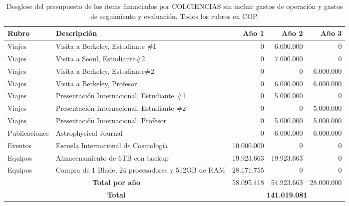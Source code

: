\begin{table}[h]
\begin{center}
\begin{tabular}{|l|p{5.5cm}|r|r|r|}\hline
{\bf Rubro}	&{\bf Descripción}	& {\bf Año 1}	& {\bf Año 2}	& {\bf Año 3}\\\hline
Viajes	&Visita a Berkeley, Estudiante \#1	&0	&	6.000.000&0\\\hline
Viajes	&Visita a Seoul,  Estudiante\#2	&0	&7.000.000	&0\\\hline
Viajes	&Visita a Berkeley,  Estudiante\#2	&0	&0& 6.000.000 \\\hline
Viajes	&Visita a Berkeley, Profesor	&0	&6.000.000	&6.000.000\\\hline
Viajes	&Presentación Internacional, Estudiante \#1	&0	&5.000.000	&0\\\hline
Viajes	&Presentación Internacional, Estudiante \#2	&0	&0	&5.000.000\\\hline
Viajes	&Presentación Internacional, Profesor	&0	&5.000.000	&5.000.000\\\hline
Publicaciones	&Astrophysical Journal	&0	&6.000.000	&6.000.000\\\hline
Eventos	&Escuela Internacional de Cosmología	&10.000.000	&0	&0\\\hline
Equipos	&Almacenamiento de 6TB con backup 	&19.923.663	&19.923.663	&0\\\hline
Equipos	&Compra de 1 Blade, 24 procesadores y 512GB de RAM 	&28.171.755	&0	&0\\\hline
\multicolumn{2}{|c|}{{\bf Total por año}}	 & 58.095.418	&54.923.663	&28.000.000 \\\hline
\multicolumn{2}{|c|}{\bf Total } & \multicolumn{3}{|c|}{{\bf 141.019.081}}\\\hline
\end{tabular} 
\caption{Desglose del presupuesto de los items financiados por COLCIENCIAS sin incluir gastos de 
operaci\'on y gastos de seguimiento y evaluaci\'on. Todos los rubros en COP.}
\end{center}
\label{Resumen Presupuesto Colciencias}
\end{table}



